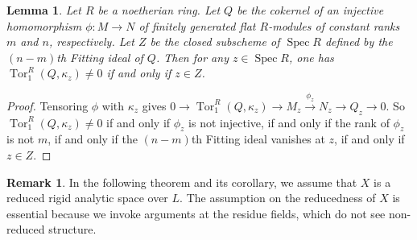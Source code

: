 \documentclass[12pt]{article}
\newtheorem{lemma}[theorem]{Lemma}
\theoremstyle{definition}
\newtheorem{remark}[theorem]{Remark}
\numberwithin{equation}{theorem}
\DeclareMathOperator{\Spec}{Spec}
\DeclareMathOperator{\Tor}{Tor}
\begin{document}
\begin{lemma}
\label{L:tor given by Fitting}
Let $R$ be a noetherian ring.
Let $Q$ be the cokernel of an injective homomorphism $\phi: M \to N$ of finitely generated flat $R$-modules of constant ranks $m$ and $n$, respectively.  Let $Z$ be the closed subscheme of $\Spec R$ defined by the $(n-m)$th Fitting ideal of $Q$.  Then for any $z \in \Spec R$, one has $\Tor_1^R(Q, \kappa_z) \neq 0$ if and only if $z \in Z$.
\end{lemma}
\begin{proof}
Tensoring $\phi$ with $\kappa_z$ gives $0 \to \Tor_1^R(Q, \kappa_z) \to M_z \xrightarrow{\phi_z} N_z \to Q_z \to 0$.  So $\Tor_1^R(Q, \kappa_z) \neq 0$ if and only if $\phi_z$ is not injective, if and only if the rank of $\phi_z$ is not $m$, if and only if the $(n-m)$th Fitting ideal vanishes at $z$, if and only if $z \in Z$.
\end{proof}

\begin{remark}
In the following theorem and its corollary, we assume that $X$ is a
reduced rigid analytic space over $L$.  The assumption on the
reducedness of $X$ is essential because we invoke arguments at the
residue fields, which do not see non-reduced structure.
\end{remark}
\end{document}
